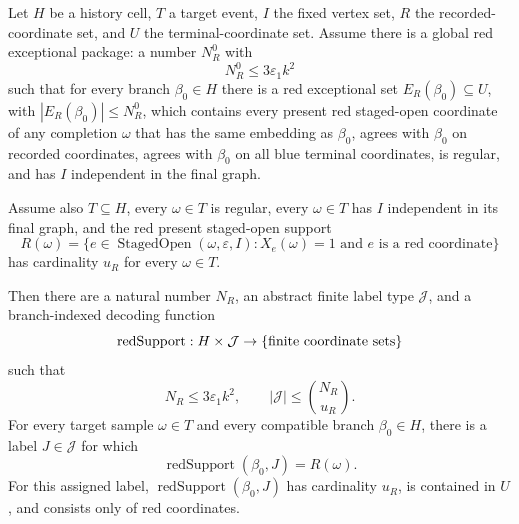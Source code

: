 \begin{helper}
Let \(H\) be a history cell, \(T\) a target event, \(I\) the fixed vertex set,
\(R\) the recorded-coordinate set, and \(U\) the terminal-coordinate set.
Assume there is a global red exceptional package: a number \(N_R^0\) with
\[
N_R^0\le 3\varepsilon_1 k^2
\]
such that for every branch \(\beta_0\in H\) there is a red exceptional set
\(E_R(\beta_0)\subseteq U\), with \(|E_R(\beta_0)|\le N_R^0\), which contains
every present red staged-open coordinate of any completion \(\omega\) that
has the same embedding as \(\beta_0\), agrees with \(\beta_0\) on recorded
coordinates, agrees with \(\beta_0\) on all blue terminal coordinates, is
regular, and has \(I\) independent in the final graph.

Assume also \(T\subseteq H\), every \(\omega\in T\) is regular, every
\(\omega\in T\) has \(I\) independent in its final graph, and the red
present staged-open support
\[
R(\omega)=
\{e\in \operatorname{StagedOpen}(\omega,\varepsilon,I):
  X_e(\omega)=1\text{ and }e\text{ is a red coordinate}\}
\]
has cardinality \(u_R\) for every \(\omega\in T\).

Then there are a natural number \(N_R\), an abstract finite label type
\(\mathcal J\), and a branch-indexed decoding function
\[
\operatorname{redSupport}:H\times
\mathcal J\to \{\hbox{finite coordinate sets}\}
\]
such that
\[
N_R\le 3\varepsilon_1 k^2,\qquad
|\mathcal J|\le \binom{N_R}{u_R}.
\]
For every target sample \(\omega\in T\) and every compatible branch
\(\beta_0\in H\), there is a label \(J\in\mathcal J\) for which
\[
\operatorname{redSupport}(\beta_0,J)=R(\omega).
\]
For this assigned label, \(\operatorname{redSupport}(\beta_0,J)\) has
cardinality \(u_R\), is contained in \(U\), and consists only of red
coordinates.
\end{helper}
